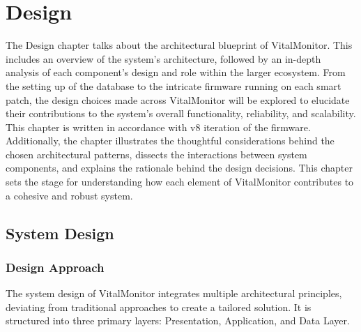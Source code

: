 \chapter{Design}

The Design chapter talks about the architectural blueprint of VitalMonitor. This includes an overview of the system's architecture, followed by an in-depth analysis of each component's design and role within the larger ecosystem. From the setting up of the database to the intricate firmware running on each smart patch, the design choices made across VitalMonitor will be explored to elucidate their contributions to the system's overall functionality, reliability, and scalability. This chapter is written in accordance with v8 iteration of the firmware.\\

Additionally, the chapter illustrates the thoughtful considerations behind the chosen architectural patterns, dissects the interactions between system components, and explains the rationale behind the design decisions. This chapter sets the stage for understanding how each element of VitalMonitor contributes to a cohesive and robust system.

\section{System Design}
\subsection{Design Approach}

\noindent The system design of VitalMonitor integrates multiple architectural principles, deviating from traditional approaches to create a tailored solution. It is structured into three primary layers: Presentation, Application, and Data Layer.

